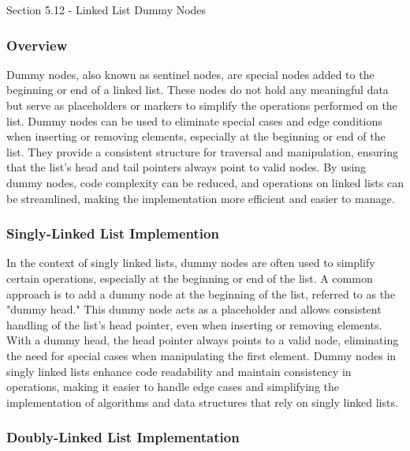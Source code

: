 \begin{notes}{Section 5.12 - Linked List Dummy Nodes}
    \subsubsection*{Overview}

    Dummy nodes, also known as sentinel nodes, are special nodes added to the beginning or end of a linked list. These nodes do not hold any meaningful data but serve as placeholders or markers to simplify the operations performed on the list. Dummy nodes can be used to eliminate special cases and edge conditions when inserting or removing elements, 
    especially at the beginning or end of the list. They provide a consistent structure for traversal and manipulation, ensuring that the list's head and tail pointers always point to valid nodes. By using dummy nodes, code complexity can be reduced, and operations on linked lists can be streamlined, making the implementation more efficient and easier 
    to manage.
    
    \subsubsection*{Singly-Linked List Implemention}
    
    In the context of singly linked lists, dummy nodes are often used to simplify certain operations, especially at the beginning or end of the list. A common approach is to add a dummy node at the beginning of the list, referred to as the "dummy head." This dummy node acts as a placeholder and allows consistent handling of the list's head pointer, even 
    when inserting or removing elements. With a dummy head, the head pointer always points to a valid node, eliminating the need for special cases when manipulating the first element. Dummy nodes in singly linked lists enhance code readability and maintain consistency in operations, making it easier to handle edge cases and simplifying the implementation 
    of algorithms and data structures that rely on singly linked lists.
    
    \subsubsection*{Doubly-Linked List Implementation}
    

\end{notes}
